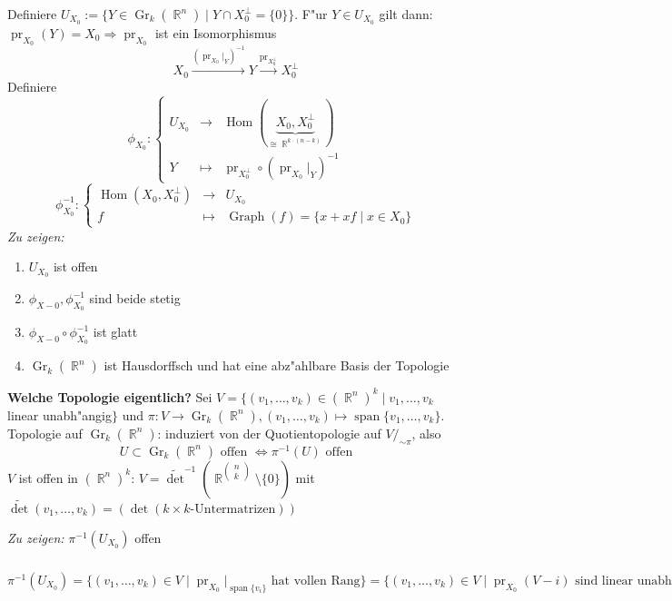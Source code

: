 \documentclass[paper=A4, twoside, chapterprefix=true, bibliography=totoc, headsepline]{scrbook}
\let\temp\phi
\let\phi\varphi
\let\varphi\temp
\let\temp\theta
\let\theta\vartheta
\let\vartheta\temp
\let\temp\epsilon
\let\epsilon\varepsilon
\let\varepsilon\temp
\let\temp\rho
\let\rho\varrho
\let\varrho\temp
\DeclareMathOperator{\R}{\mathbb{R}}
\DeclareMathOperator{\mspan}{span} %
\DeclareMathOperator{\pr}{pr}
\DeclareMathOperator{\Gr}{Gr}
\DeclareMathOperator{\Graph}{Graph}
\DeclareMathOperator{\Hom}{Hom} %
\newcommand{\modulo}[1]{\ensuremath{/_{\displaystyle #1}}}
\theoremstyle{plain}
\theoremstyle{nonumberplain}
\theoremstyle{empty}
\theoremstyle{break}
\begin{document}
Definiere $U_{X_0} := \{Y \in \Gr_k(\R^n) \mid Y \cap X_0^\perp = \{0\}\}$. F"ur $Y \in U_{X_0}$ gilt dann: $\pr_{X_0}(Y) = X_0 \Rightarrow \pr_{X_0}$ ist ein Isomorphismus
	\[X_0 \xrightarrow{(\pr_{X_0}|_Y)^{-1}} Y \xrightarrow{\pr_{X_0^\perp}} X_0^\perp \]
Definiere
	\[ \varphi_{X_0}: \left\{\begin{array}{ccl} U_{X_0} &\to& \Hom(\underbrace{X_0, X_0^\perp}_{\cong \R^{k \cdot (n-k)}}) \\
		Y &\mapsto& \pr_{X_0^\perp} \circ (\pr_{X_0}|_Y)^{-1} \end{array}\right.\]
	\[ \varphi_{X_0}^{-1}: \left\{\begin{array}{ccl} \Hom(X_0, X_0^\perp) &\to& U_{X_0} \\
		f &\mapsto& \Graph(f) = \{x + xf \mid x \in X_0\} \end{array}\right.\]
\emph{Zu zeigen:}\begin{enumerate}
\item
	$U_{X_0}$ ist offen
\item
	$\varphi_{X-0}, \varphi_{X_0}^{-1}$ sind beide stetig
\item
	$\varphi_{X-0} \circ \varphi_{X_0}^{-1}$ ist glatt
\item
	$\Gr_k(\R^n)$ ist Hausdorffsch und hat eine abz"ahlbare Basis der Topologie
\end{enumerate}

\textbf{Welche Topologie eigentlich?} Sei $V = \{ (v_1,\ldots, v_k) \in (\R^n)^k \mid v_1,\ldots, v_k$ linear unabh"angig$\}$ und $\pi: V \to \Gr_k(\R^n), (v_1,\ldots ,v_k) \mapsto \mspan\{v_1,\ldots ,v_k\}$. Topologie auf $\Gr_k(\R^n)$: induziert von der Quotientopologie auf $V\modulo{\sim\pi}$, also
	\[U \subset \Gr_k(\R^n) \text{ offen } \Leftrightarrow \pi^{-1}(U) \text{ offen} \]
$V$ ist offen in $(\R^n)^k$: $V = \widetilde{\det}^{-1}(\R^{\left(\begin{smallmatrix}n \\ k\end{smallmatrix}\right)} \setminus \{0\})$ mit $\widetilde{\det}(v_1,\ldots,v_k) = (\det(k \times k\text{-Untermatrizen}))$

\emph{Zu zeigen:} $\pi^{-1}(U_{X_0})$ offen

$\pi^{-1}(U_{X_0}) = \{(v_1,\ldots ,v_k) \in V \mid \pr_{X_0}|_{\mspan\{v_i\}} \text{ hat vollen Rang}\} = \{(v_1,\ldots ,v_k) \in V \mid \pr_{X_0}(V-i) \text{ sind linear unabh"angig} \} = (\widetilde{\det} \circ (\pr_{X_0},\ldots ,\pr_{X_0}))^{-1}(\R^{\left(\begin{smallmatrix}n \\ k\end{smallmatrix}\right)} \setminus \{0\})$
\end{document}
